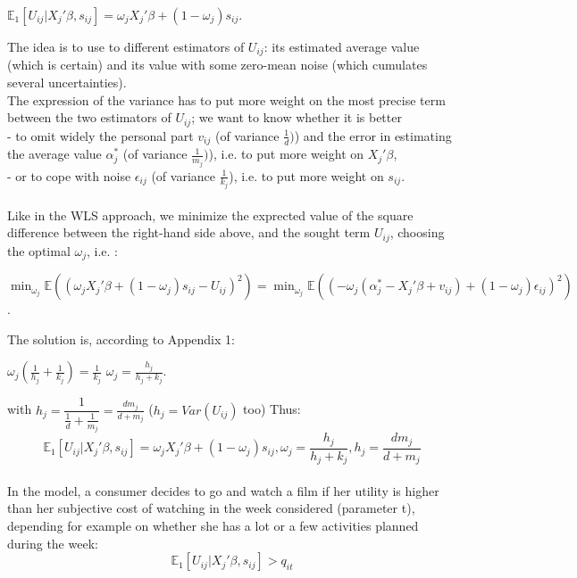 	\begin{center}
		$\mathbb{E}_1[U_{i j}|X_{j}'\beta, s_{i j}]=\omega_{j} X_{j}'\beta+(1-\omega_{j})s_{i j}$.
	\end{center}
	The idea is to use to different estimators of $U_{i j}$: its estimated average value (which is certain) and its value with some zero-mean noise (which cumulates several uncertainties).\\
	The expression of the variance has to put more weight on the most precise term between the two estimators of $U_{i j}$; we want to know whether it is better \\
	- to omit widely the personal part $v_{i j}$ (of variance $\frac{1}{d})$) and the error in estimating the average value $\alpha_{j}^{*}$ (of variance $\frac{1}{m_{j}})$), i.e. to put more weight on $X_{j}'\beta$,\\
	- or to cope with noise $\epsilon_{i j}$ (of variance $\frac{1}{k_{j}}$), i.e. to put more weight on $s_{i j}$.\\
	\\
	Like in the WLS approach, we minimize the exprected value of the square difference between the right-hand side above, and the sought term $U_{i j}$, choosing the optimal $\omega_{j}$, i.e. :
	\begin{center}
		$\min_{\omega_{j}} \mathbb{E}((\omega_{j} X_{j}'\beta+(1-\omega_{j})s_{i j}-U_{i j})^{2})=\min_{\omega_{j}} \mathbb{E}((-\omega_{j} (\alpha_{j}^{*}-X_{j}'\beta+v_{i j})+(1-\omega_{j})\epsilon_{i j})^{2})$.
	\end{center}
	The solution is, according to Appendix 1:
	\begin{center}
		$\omega_{j}(\frac{1}{h_{j}}+\frac{1}{k_{j}})=\frac{1}{k_{j}}$
		$\omega_j=\frac{h_{j}}{h_{j}+k_{j}}$.
	\end{center}
	with $h_{j}=\dfrac{1}{\frac{1}{d}+\frac{1}{m_{j}}}=\frac{d m_{j}}{d+m_{j}}$ ($h_{j}=Var(U_{i j})$ too)
	Thus:
	\begin{equation}
	\mathbb{E}_1[U_{i j}|X_{j}'\beta, s_{i j}]=\omega_{j} X_{j}'\beta+(1-\omega_{j})s_{i j}, \omega_j=\frac{h_{j}}{h_{j}+k_{j}}, h_{j}=\frac{d m_{j}}{d+m_{j}}
	\end{equation}
	\\
	In the model, a consumer decides to go and watch a film if her utility is higher than her subjective cost of watching in the week considered (parameter t), depending for example on whether she has a lot or a few activities planned during the week: 
	\begin{equation}
	\mathbb{E}_1[U_{i j}|X_{j}'\beta, s_{i j}]>q_{i t}
	\end{equation}
